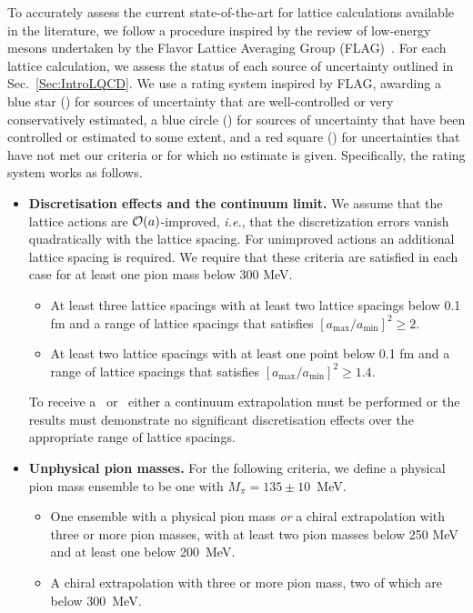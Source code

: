 To accurately assess the current state-of-the-art for lattice calculations
available in the literature, we follow a procedure inspired by the review of 
low-energy mesons undertaken by the Flavor Lattice Averaging Group 
(FLAG)~\cite{Aoki:2016frl}. 
%
For each lattice calculation, we assess the status of each source of 
uncertainty outlined in Sec.~\ref{Sec:IntroLQCD}. 
%
We use a rating system inspired by FLAG, awarding a blue star (\bstar) for 
sources of uncertainty that are well-controlled or very conservatively 
estimated, a blue circle (\bcirc) for sources of uncertainty that have been 
controlled or estimated to some extent, and a red square (\rsquare) for 
uncertainties that have not met our criteria or for which no estimate is given.
%
Specifically, the rating system works as follows.

\begin{itemize}
\item {\bfseries Discretisation effects and the continuum limit.} 
We assume that the lattice actions are ${\cal O}(a)$-improved, {\it i.e.}, 
that the discretization errors vanish quadratically with the lattice spacing. 
%
For unimproved actions an additional lattice spacing is required. 
%
We require that these criteria are satisfied in each case for at least one 
pion mass below 300 MeV.
%
\begin{itemize}
%
\item[\bstar] At least three lattice spacings with at least two lattice 
spacings below 0.1 fm and a range of lattice spacings that satisfies 
$[a_{\mathrm{max}}/a_{\mathrm{min}}]^2 \geq 2$.
%
\item[\bcirc] At least two lattice spacings with at least one point below 
0.1 fm and a range of lattice spacings that satisfies 
$[a_{\mathrm{max}}/a_{\mathrm{min}}]^2 \geq 1.4$.
%
\end{itemize}
%
To receive a \bstar~or \bcirc~either a continuum extrapolation must be 
performed or the results must demonstrate no significant discretisation 
effects over the appropriate range of lattice spacings.

\item {\bfseries Unphysical pion masses.} 
For the following criteria, we define a physical pion mass ensemble 
to be one with $M_\pi=135\pm 10$~MeV.
%
\begin{itemize}
\item[\bstar] One ensemble with a physical pion mass \emph{or} a chiral 
extrapolation with three or more pion masses, with at least two pion masses 
below 250 MeV and at least one below 200~MeV.
%
\item[\bcirc] A chiral extrapolation with three or more pion mass, two of 
which are below 300~MeV.
%
\end{itemize}


\end{itemize}
